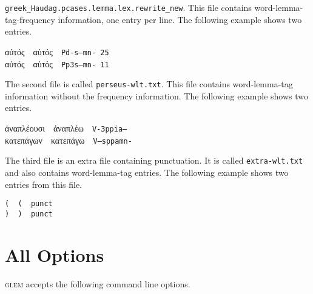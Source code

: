 \documentclass[a4paper]{article}
\def\glem{\textsc{glem}}
\begin{document}
\texttt{greek\_Haudag.pcases.lemma.lex.rewrite\_new}. This file contains
word-lemma-tag-frequency information, one entry per line. The following example
shows two entries.

\begin{tcolorbox}
αὐτός~~αὐτός~~\texttt{Pd-s---mn- 25}\\
  αὐτός~~αὐτός~~\texttt{Pp3s---mn- 11}
\end{tcolorbox}

The second file is called \texttt{perseus-wlt.txt}. This file contains
word-lemma-tag information without the frequency information. The following
example shows two entries.

\begin{tcolorbox}
ἀναπλέουσι~~ἀναπλέω~~\texttt{V-3ppia---}\\
κατεπάγων~~κατεπάγω~~\texttt{V--sppamn-}
\end{tcolorbox}

The third file is an extra file containing punctuation. It is called
\texttt{extra-wlt.txt} and also contains word-lemma-tag entries. The following
example shows two entries from this file.

\begin{tcolorbox}
\texttt{(~~(~~punct}\\
\texttt{)~~)~~punct}
\end{tcolorbox}

\section*{All Options}

\glem{} accepts the following command line options.
\end{document}
